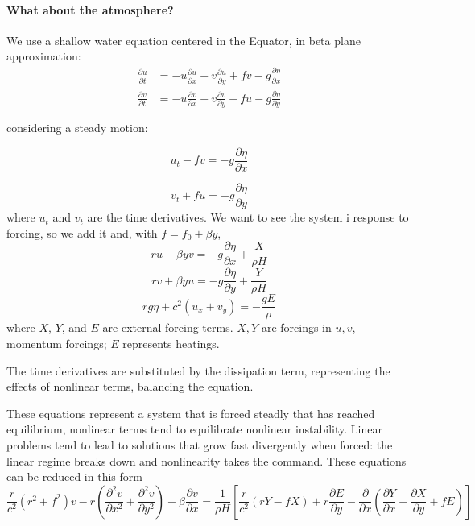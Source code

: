 \paragraph{What about the atmosphere?}
We use a shallow water equation centered in the Equator, in beta plane approximation:
\[\begin{aligned}
		\frac{\partial u}{\partial t} & = -u \frac{\partial u}{\partial x} -v \frac{\partial u}{\partial y} + f v -g\frac{\partial \eta}{\partial x} \\
		\frac{\partial v}{\partial t} & = -u \frac{\partial v}{\partial x} -v \frac{\partial v}{\partial y} - f u -g\frac{\partial \eta}{\partial y} \\
		\\
	\end{aligned}\]
considering a steady motion:

\begin{equation}
	u_t- fv = -g \frac{\partial \eta}{\partial x}
\end{equation}

\begin{equation}
	v_t + fu = -g \frac{\partial \eta}{\partial y}
\end{equation}
where $u_t$ and $v_t$ are the time derivatives.
We want to see the system i response to forcing, so we add it and, with $f=f_0+\beta y$,
$$ru-\beta y v = -g \frac{\partial \eta}{\partial x} + \frac{X}{\rho H}$$
$$rv+\beta y u = -g \frac{\partial \eta}{\partial y} + \frac{Y}{\rho H}$$
$$rg\eta+c^2 (u_x + v_y) = -\frac{gE}{\rho}$$
where $X$, $Y$, and $E$ are external forcing terms. $X,Y$ are forcings in $u,v$, momentum forcings; $E$ represents heatings.

The time derivatives are substituted by the dissipation term, representing the effects of nonlinear terms, balancing the equation.


These equations represent a system that is forced steadly that has reached equilibrium, nonlinear terms tend to equilibrate nonlinear instability. Linear problems tend to lead to solutions that grow fast divergently when forced: the linear regime breaks down and nonlinearity takes the command.
These equations can be reduced in this form
\begin{equation}\label{2.11}
	\frac{r}{c^2} \left( r^2 + f^2 \right) v - r \left( \frac{\partial^2 v}{\partial x^2} + \frac{\partial^2 v}{\partial y^2} \right) - \beta \frac{\partial v}{\partial x}
	= \frac{1}{\rho H}\left[ \frac{r}{c^2} \left( rY - fX \right) + r \frac{\partial E}{\partial y} - \frac{\partial}{\partial x} \left( \frac{\partial Y}{\partial x} - \frac{\partial X}{\partial y} + fE \right)\right]
\end{equation}

